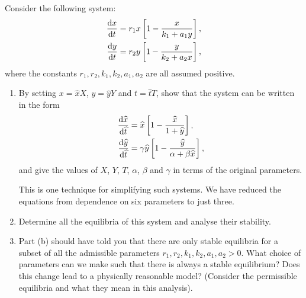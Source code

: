 \documentclass[a4paper, 12pt]{article}
\begin{document}
%

\begin{enumerate}[label={\bf \arabic{*}.\;}, ref={\arabic{*}},itemsep=3ex, left=0ex]

    {
      Consider the following system:
      \begin{subequations}
        \begin{align}
          \fd{x}{t} &= r_1x\left[1-\frac{x}{k_1 + a_1 y}\right],\\
          \fd{y}{t} &= r_2y\left[1-\frac{y}{k_2 + a_2 x}\right],
        \end{align}
      \end{subequations}
      where the constants $r_1,r_2,k_1,k_2,a_1,a_2$ are all assumed positive.
      \begin{enumerate}[label=(\alph*)]
        \item
          By setting $x = \hat{x}X$, $y = \hat{y}Y$ and $t = \hat{t}T$, show that the system can be written in the form
          \begin{subequations}
            \begin{align}
              \fd{\hat{x}}{\hat{t}} &= \hat{x}\left[1-\frac{\hat{x}}{1 + \hat{y}}\right],\\
              \fd{\hat{y}}{\hat{t}} &= \gamma \hat{y}\left[1-\frac{\hat{y}}{\alpha + \beta \hat{x}}\right],
            \end{align}
          \end{subequations}
          and give the values of $X$, $Y$, $T$, $\alpha$, $\beta$ and $\gamma$ in terms of the original parameters.

          This is one technique for simplifying such systems. We have reduced the equations from dependence on six parameters to just three.
        \item Determine all the equilibria of this system and analyse their stability.
        \item Part (b) should have told you that there are only stable equilibria for a subset of all the admissible parameters $r_1,r_2,k_1,k_2,a_1,a_2>0$. What choice of parameters can we make such that there is always a stable equilibrium? Does this change lead to a physically reasonable model? (Consider the permissible equilibria and what they mean in this analysis).


\end{enumerate}}
\end{enumerate}
\end{document}
